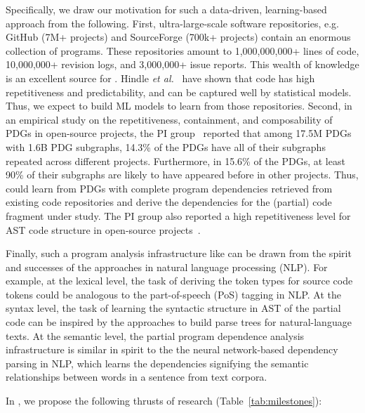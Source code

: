 Specifically, we draw our motivation for such a data-driven,
learning-based approach from the following. First, ultra-large-scale
software repositories, e.g. GitHub (7M+ projects) and SourceForge
(700k+ projects) contain an enormous collection of programs. These
repositories amount to 1,000,000,000+ lines of code, 10,000,000+
revision logs, and 3,000,000+ issue reports. This wealth of knowledge
is an excellent source for {\tool}. Hindle {\em et
  al.}~\cite{naturalness-icse12} have shown that code has high
repetitiveness and predictability, and can be captured well by
statistical models. Thus, we expect to build ML models to learn from
those repositories. Second, in an empirical study on the
repetitiveness, containment, and composability of PDGs in open-source
projects, the PI group~\cite{msr16} reported that among
17.5M PDGs with 1.6B PDG subgraphs, 14.3\% of the PDGs have all of
their subgraphs repeated across different projects. Furthermore, in
15.6\% of the PDGs, at least 90\% of their subgraphs are likely to
have appeared before in other projects. Thus, {\tool} could learn from
PDGs with complete program dependencies retrieved from existing code
repositories and derive the dependencies for the (partial) code
fragment under study. The PI group also reported a high repetitiveness
level for AST code structure in open-source
projects~\cite{icse15}.

Finally, such a program analysis infrastructure like {\tool} can be
drawn from the spirit and successes of the approaches in natural
language processing (NLP). For example, at the lexical level, the task
of deriving the token types for source code tokens could be analogous
to the part-of-speech (PoS) tagging in NLP. At the syntax level, the
task of learning the syntactic structure in AST of the partial code
can be inspired by the approaches to build parse trees for
natural-language texts. At the semantic level, the partial program
dependence analysis infrastructure is similar in spirit to the the
neural network-based dependency parsing in NLP, which learns the
dependencies signifying the semantic relationships between words in a
sentence from text corpora.




In {\tool}, we propose the following thrusts of research
(Table~\ref{tab:milestones}):

